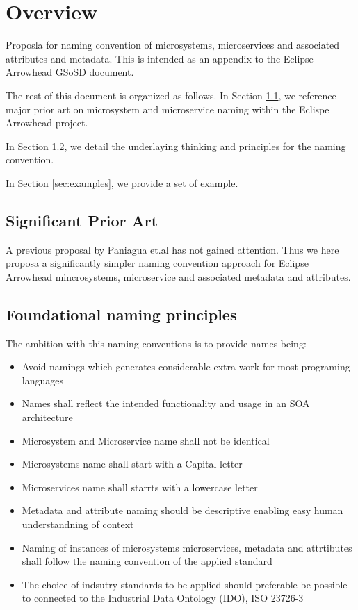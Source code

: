 \documentclass[a4paper]{arrowhead}
\begin{document}
\tableofcontents
\newpage

\section{Overview}
\label{sec:overview}
  Proposla for naming convention of microsystems, microservices and
    associated attributes and metadata. This is intended as an
    appendix to the Eclipse Arrowhead GSoSD document.
    
The rest of this document is organized as follows.
In Section \ref{sec:prior_art}, we reference major prior art on
microsystem and microservice naming within the Eclispe Arrowhead project. 

In Section \ref{sec:principles}, we detail the underlaying thinking
and principles for the
naming convention.

In Section \ref{sec:examples}, we provide a set of example.


\newpage

\subsection{Significant Prior Art}
\label{sec:prior_art}

A previous proposal by Paniagua et.al \cite{Paniagua_2019} has not
  gained attention. Thus we here proposa a significantly simpler
  naming convention approach for Eclipse Arrowhead mincrosystems,
  microservice and associated metadata and attributes.

\subsection{Foundational naming principles}
\label{sec:principles}
The ambition with this naming conventions is to provide names being:
\begin{itemize}
\item Avoid namings which generates considerable extra work for most programing
  languages
\item Names shall reflect the intended functionality and usage in an SOA
  architecture
\item Microsystem and Microservice name shall not be identical
\item Microsystems name shall start with a Capital letter
\item Microservices name shall starrts with a lowercase letter

\item Metadata and attribute naming should be descriptive enabling
  easy human understandning of context
  
\item Naming of instances of microsystems microservices, metadata and
  attrtibutes shall follow  the naming convention of the
  applied standard
  
\item The choice of indsutry standards to be applied should preferable
  be possible to connected to the Industrial Data Ontology (IDO), ISO 23726-3
\end{itemize}
\end{document}

